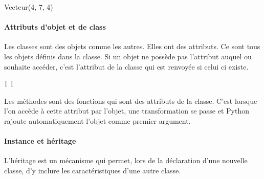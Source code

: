 \documentclass[letterpaper,10pt,english]{sphinxhowto}
\begin{document}
\begin{sphinxVerbatim}[commandchars=\\\{\}]
Vecteur(4, 7, 4)
\end{sphinxVerbatim}


\paragraph{Attributs d’objet et de class}
\label{\detokenize{cours6_objet_cours:attributs-d-objet-et-de-class}}
\sphinxAtStartPar
Les classes sont des objets comme les autres. Elles ont des attributs. Ce sont tous les objets définis dans la classe. Si un objet ne possède pas l’attribut auquel ou souhaite accéder, c’est l’attribut de la classe qui est renvoyée si celui ci existe.

\begin{sphinxVerbatim}[commandchars=\\\{\}]
 
      
    
  
 
   
 
\end{sphinxVerbatim}

\begin{sphinxVerbatim}[commandchars=\\\{\}]
1
1
\end{sphinxVerbatim}

\sphinxAtStartPar
Les méthodes sont des fonctions qui sont des attributs de la classe. C’est lorsque l’on accède à cette attribut par l’objet, une transformation se passe et Python rajoute automatiquement l’objet comme premier argument.


\paragraph{Instance et héritage}
\label{\detokenize{cours6_objet_cours:instance-et-heritage}}
\sphinxAtStartPar
L’héritage est un mécanisme qui permet, lors de la déclaration d’une nouvelle classe, d’y inclure les caractéristiques d’une autre classe.
\end{document}
